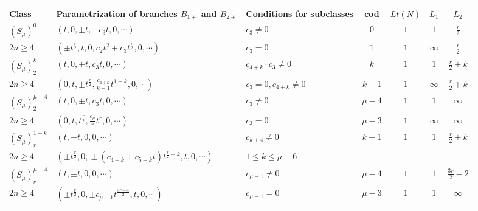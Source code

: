 \documentclass{amsart}
\theoremstyle{definition}
\numberwithin{equation}{section}
\begin{document}
\begin{center}
\begin{table}[h]

    \begin{small}
    \noindent
    \begin{tabular}{|p{1.3cm}|p{4.7cm}|p{2.3cm}|c|c|c|c|}
                      \hline
    Class &  Parametrization  of branches \newline $B_{1\pm}$ and $B_{2\pm}$ & Conditions \newline for subclasses  & cod & $Lt(N)$   &  $L_1$ & $L_2$ \\ \hline

        $(S_{\mu})^0$ & $(t,0,\pm t,-c_3t,0,\cdots )$ & $c_3\ne 0$& $0$ & $1$ & $1$ & ${\frac{r}{2}}$ \\ \cline{3-7}
     $2n\ge 4$ & $(\pm t^{\frac{r}{2}}\!,t\!,0,c_2t^2\!\mp c_3t^{\frac{r}{2}}\!,0,\cdots )$ & $c_3=0$ & $1$ & $1$ & $\infty$ & ${\frac{r}{2}}$ \\ \hline

$(S_{\mu})^{k}_2$  & $(t,0, \pm t, c_3 t,0,\cdots)$ &  $c_{4+k}\cdot c_3\!\ne\!0$ & $k$ & $1$ & $1$ & $\frac{r}{2}\!+\!k$   \\ \cline{3-7}
$2n\ge 4$  & $(0,t,\pm t^{\frac{r}{2}}, \frac{c_{4+k}}{k+1} t^{1+k}, 0,\cdots)$ & $c_3\!=0, c_{4+k}\!\ne 0$  & $k\!+\!1$ & $1$ & $\infty$  & $\frac{r}{2}\!+\!k$ \\ \hline

$(S_{\mu})^{\mu-4}_2$  & $(t,0, \pm t, c_3 t,0,\cdots)$ & $c_3\ne 0$   & $\mu\!-\!4$ & $1$ & $1$ & $\infty$   \\ \cline{3-7}
$2n\ge 4$  & $(0,t,t^{\frac{r}{2}}, \frac{c_{\mu}}{r} t^{r}, 0,\cdots)$ & $c_3=0$ & $\mu\!-\!3$ & $1$  & $\infty$ & $\infty$ \\ \hline

    $(S_{\mu})^{1+\!k}_r$ & $(t, \pm t, 0, 0,\cdots)$ & $c_{k+4}\ne 0$ & $k\!+\!1$ & $1$ & $1$ & $\frac{r}{2}\!+\!k$ \\
    $2n\ge 4$ & $(\pm t^{\frac{r}{2}}\!,\! 0,\!\pm (c_{4\!+\!k}\!+\!c_{5\!+\!k}t)t^{\frac{r}{2}+k}\!,t\!, 0,\!\cdots)$ & $1\!\leq k \leq \mu\! -6$  &   &  &  &  \\ \hline

    $(S_{\mu})^{\mu-4}_r$  & $(t, \pm t,0, 0,\cdots)$ & $c_{\mu-1}\ne 0$  & $\mu\!-\!4$ & $1$ & $1$ & $\frac{3r}{2}\!-\!2$   \\ \cline{3-7}
 $2n\ge 4$  & $(\pm t^{\frac{r}{2}},0,\pm c_{\mu-1}t^{\frac{3r-4}{2}},t, 0,\cdots)$ &  $c_{\mu-1}=0$ & $\mu\!-\!3$ &  $1$ & $1$ & $\infty$ \\   \hline


\end{tabular}
\end{small}
\end{table}
\end{center}
\end{document}
